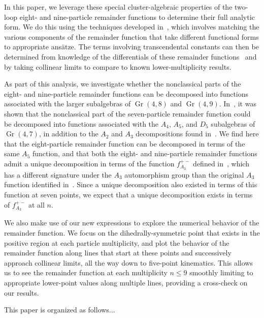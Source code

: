 \documentclass[11pt]{article}
\DeclareMathOperator{\Gr}{Gr}
\begin{document}
In this paper, we leverage these special cluster-algebraic properties of the two-loop eight- and nine-particle remainder functions to determine their full analytic form. We do this using the techniques developed in~\cite{Golden:2014xqa,Golden:2014xqf,Golden:2018gtk,Golden:2019kks}, which involves matching the various components of the remainder function that take different functional forms to appropriate ans\"atze. The terms involving transcendental constants can then be determined from knowledge of the differentials of these remainder functions~\cite{CaronHuot:2011ky,Golden:2013lha} and by taking collinear limits to compare to known lower-multiplicity results.

As part of this analysis, we investigate whether the nonclassical parts of the eight- and nine-particle remainder functions can be decomposed into functions associated with the larger subalgebras of $\Gr(4,8)$ and $\Gr(4,9)$. In~\cite{Golden:2018gtk}, it was shown that the nonclassical part of the seven-particle remainder function could be decomposed into functions associated with the $A_4$, $A_5$, and $D_5$ subalgebras of $\Gr(4,7)$, in addition to the $A_2$ and $A_3$ decompositions found in~\cite{Golden:2014xqa}. We find here that the eight-particle remainder function can be decomposed in terms of the same $A_5$ function, and that both the eight- and nine-particle remainder functions admit a unique decomposition in terms of the function $f_{A_3}^{+-}$ defined in~\cite{Golden:2014xqa}, which has a different signature under the $A_3$ automorphism group than the original $A_3$ function identified in~\cite{Golden:2014xqa}. Since a unique decomposition also existed in terms of this function at seven points, we expect that a unique decomposition exists in terms of $f_{A_3}^{+-}$ at all $n$.

We also make use of our new expressions to explore the numerical behavior of the remainder function. We focus on the dihedrally-symmetric point that exists in the positive region at each particle multiplicity, and plot the behavior of the remainder function along lines that start at these points and successively approach collinear limits, all the way down to five-point kinematics. This allows us to see the remainder function at each multiplicity $n \leq 9$ smoothly limiting to appropriate lower-point values along multiple lines, providing a cross-check on our results.
 
This paper is organized as follows...

  
\end{document}
